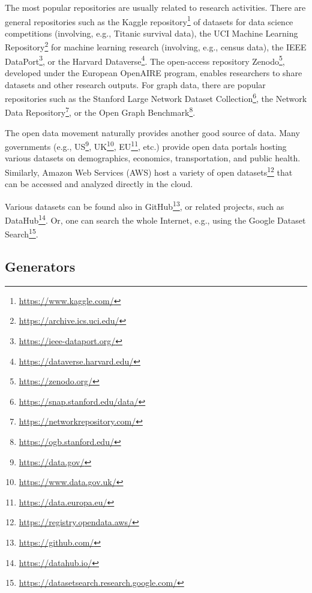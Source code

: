 The most popular repositories are usually related to research activities. There are general repositories such as the Kaggle repository\footnote{\url{https://www.kaggle.com/}} of datasets for data science competitions (involving, e.g., Titanic survival data), the UCI Machine Learning Repository\footnote{\url{https://archive.ics.uci.edu/}} for machine learning research (involving, e.g., census data), the  IEEE DataPort\footnote{\url{https://ieee-dataport.org/}}, or the Harvard Dataverse\footnote{\url{https://dataverse.harvard.edu/}}. The open-access repository Zenodo\footnote{\url{https://zenodo.org/}}, developed under the European OpenAIRE program, enables researchers to share datasets and other research outputs.
For graph data, there are popular repositories such as the Stanford Large Network Dataset Collection\footnote{\url{https://snap.stanford.edu/data/}}, the Network Data Repository\footnote{\url{https://networkrepository.com/}}, or the Open Graph Benchmark\footnote{\url{https://ogb.stanford.edu/}}. 

The open data movement naturally provides another good source of data. Many governments (e.g., US\footnote{\url{https://data.gov/}}, UK\footnote{\url{https://www.data.gov.uk/}}, EU\footnote{\url{https://data.europa.eu/}}, etc.) provide open data portals hosting various datasets on demographics, economics, transportation, and public health. Similarly, Amazon Web Services (AWS) host a variety of open datasets\footnote{\url{https://registry.opendata.aws/}} that can be accessed and analyzed directly in the cloud.

Various datasets can be found also in GitHub\footnote{\url{https://github.com/}}, or related projects, such as DataHub\footnote{\url{https://datahub.io/}}. Or, one can search the whole Internet, e.g., using the Google Dataset Search\footnote{\url{https://datasetsearch.research.google.com/}}.

\subsection{Generators}

